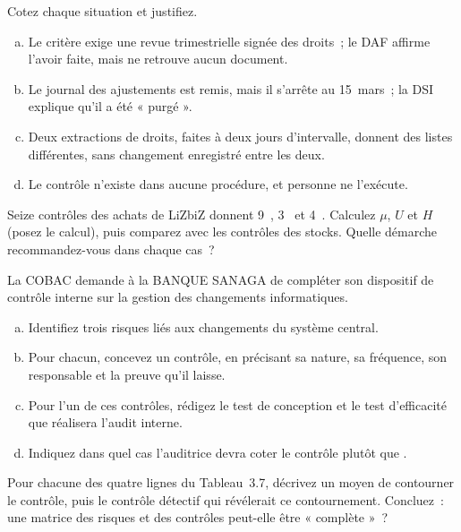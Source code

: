 \begin{boxexo}[title={\ding{45}\quad Exercice~3.7. \NON{} ou \NEK{}~? \niveaumoyen}]
Cotez chaque situation et justifiez.
\begin{enumerate}[(a)]
    \item Le critère exige une revue trimestrielle signée des droits~; le
          DAF affirme l'avoir faite, mais ne retrouve aucun document.
    \item Le journal des ajustements est remis, mais il s'arrête au
          15~mars~; la DSI explique qu'il a été « purgé ».
    \item Deux extractions de droits, faites à deux jours d'intervalle,
          donnent des listes différentes, sans changement enregistré entre
          les deux.
    \item Le contrôle n'existe dans aucune procédure, et personne ne
          l'exécute.
\end{enumerate}
\end{boxexo}

\begin{boxexo}[title={\ding{45}\quad Exercice~3.8. Lire un domaine \niveaumoyen}]
Seize contrôles des achats de LiZbiZ donnent 9~\OUI{}, 3~\NON{} et
4~\NEK{}. Calculez $\mu$, $U$ et $H$ (posez le calcul), puis comparez avec
les contrôles des stocks. Quelle démarche recommandez-vous dans chaque
cas~?
\end{boxexo}

\begin{boxexo}[title={\ding{45}\quad Exercice~3.9. Le dispositif de la BANQUE SANAGA \niveauexpert}]
La COBAC demande à la BANQUE SANAGA de compléter son dispositif de contrôle
interne sur la gestion des changements informatiques.
\begin{enumerate}[(a)]
    \item Identifiez trois risques liés aux changements du système central.
    \item Pour chacun, concevez un contrôle, en précisant sa nature, sa
          fréquence, son responsable et la preuve qu'il laisse.
    \item Pour l'un de ces contrôles, rédigez le test de conception et le
          test d'efficacité que réalisera l'audit interne.
    \item Indiquez dans quel cas l'auditrice devra coter le contrôle \NEK{}
          plutôt que \NON{}.
\end{enumerate}
\end{boxexo}

\begin{boxexo}[title={\ding{45}\quad Exercice~3.10. Contourner son propre contrôle \niveauexpert}]
Pour chacune des quatre lignes du Tableau~3.7, décrivez un moyen de
contourner le contrôle, puis le contrôle détectif qui révélerait ce
contournement. Concluez~: une matrice des risques et des contrôles peut-elle
être « complète »~?
\end{boxexo}

